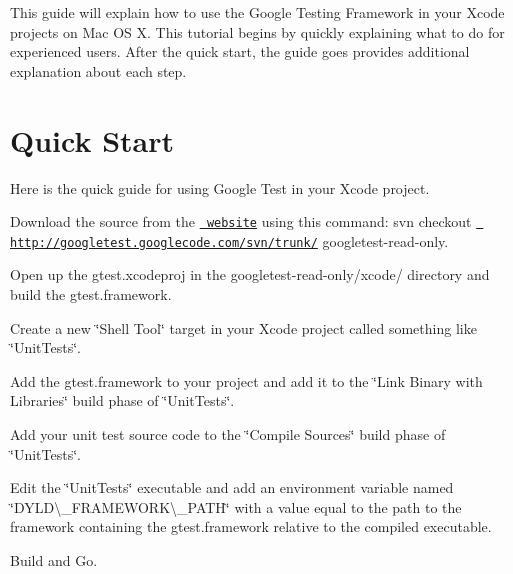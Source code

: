 This guide will explain how to use the Google Testing Framework in your Xcode projects on Mac OS X. This tutorial begins by quickly explaining what to do for experienced users. After the quick start, the guide goes provides additional explanation about each step.

\section*{Quick Start}

Here is the quick guide for using Google Test in your Xcode project.


\begin{DoxyEnumerate}
\item Download the source from the \href{https://github.com/google/googletest}{\texttt{ website}} using this command\+: {\ttfamily svn checkout \href{http://googletest.googlecode.com/svn/trunk/}{\texttt{ http\+://googletest.\+googlecode.\+com/svn/trunk/}} googletest-\/read-\/only}.
\end{DoxyEnumerate}
\begin{DoxyEnumerate}
\item Open up the {\ttfamily gtest.\+xcodeproj} in the {\ttfamily googletest-\/read-\/only/xcode/} directory and build the gtest.\+framework.
\end{DoxyEnumerate}
\begin{DoxyEnumerate}
\item Create a new \char`\"{}\+Shell Tool\char`\"{} target in your Xcode project called something like \char`\"{}\+Unit\+Tests\char`\"{}.
\end{DoxyEnumerate}
\begin{DoxyEnumerate}
\item Add the gtest.\+framework to your project and add it to the \char`\"{}\+Link Binary with Libraries\char`\"{} build phase of \char`\"{}\+Unit\+Tests\char`\"{}.
\end{DoxyEnumerate}
\begin{DoxyEnumerate}
\item Add your unit test source code to the \char`\"{}\+Compile Sources\char`\"{} build phase of \char`\"{}\+Unit\+Tests\char`\"{}.
\end{DoxyEnumerate}
\begin{DoxyEnumerate}
\item Edit the \char`\"{}\+Unit\+Tests\char`\"{} executable and add an environment variable named \char`\"{}\+D\+Y\+L\+D\textbackslash{}\+\_\+\+F\+R\+A\+M\+E\+W\+O\+R\+K\textbackslash{}\+\_\+\+P\+A\+T\+H\char`\"{} with a value equal to the path to the framework containing the gtest.\+framework relative to the compiled executable.
\end{DoxyEnumerate}
\begin{DoxyEnumerate}
\item Build and Go.
\end{DoxyEnumerate}

